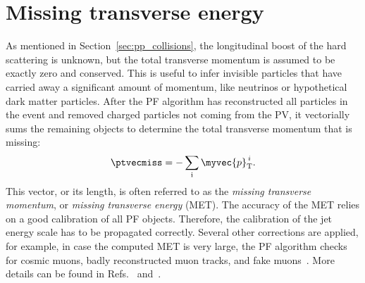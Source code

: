 \section{Missing transverse energy}\label{sec:met}

As mentioned in Section~\ref{sec:pp_collisions}, the longitudinal boost of the hard scattering is unknown, but the total transverse momentum is assumed to be exactly zero and conserved. This is useful to infer invisible particles that have carried away a significant amount of momentum, like neutrinos or hypothetical dark matter particles.
After the PF algorithm has reconstructed all particles in the event and removed charged particles not coming from the PV, it vectorially sums the remaining objects to determine the total transverse momentum that is missing:
\begin{equation} \label{eq:MET}
  \ptvecmiss = - \sum_{\text{i}}\myvec{p}_\text{T}^{\,i}.
\end{equation}
This vector, or its length, is often referred to as the \emph{missing transverse momentum}, or \emph{missing transverse energy} (MET).
The accuracy of the MET relies on a good calibration of all PF objects.
Therefore, the calibration of the jet energy scale has to be propagated correctly.
Several other corrections are applied, for example, in case the computed MET is very large, the PF algorithm checks for cosmic muons, badly reconstructed muon tracks, and fake muons~\cite{PF2017}.
More details can be found in Refs.~\cite{CMS-PAS-JME-16-004} and~\cite{CMS-PAS-JME-17-001}. 



